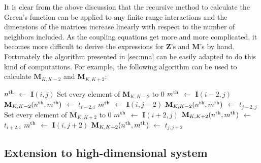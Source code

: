 It is clear from the above discussion that the recursive method to calculate the Green's function can be applied to 
any finite range interactions and the dimensions of the matrices increase linearly with respect to the number of 
neighbors included. As the coupling equations get more and more complicated, it becomes more difficult to derive 
the expressions for $\mathbf{Z}$'s and $\mathbf{M}$'s by hand. Fortunately the algorithm presented in 
\autoref{sec:nna} can be easily adapted to do this kind of computations. For example, the following algorithm can
be used to calculate $\mathbf{M}_{K,K-2}$ and $\mathbf{M}_{K,K+2}$:
\begin{algorithmic}[1]
     \State $n^{\rm th}$ $\gets$ $\mathbf{I}(i,j)$
     \State Set every element of $\mathbf{M}_{K,K-2}$ to 0
                   \State $m^{\rm th}$ $\gets$ $ \mathbf{I}(i-2, j)$  
                   \State $\mathbf{M}_{K,K-2}(n^{\rm th}, m^{\rm th})$ $\gets$ $t_{i-2, i}$
       \EndIf
%
                   \State $m^{\rm th}$ $\gets$ $ \mathbf{I}(i, j-2)$  
                   \State $\mathbf{M}_{K,K-2}(n^{\rm th}, m^{\rm th})$ $\gets$ $t_{j-2, j}$
       \EndIf
        \State Set every element of $\mathbf{M}_{K,K+2}$ to 0
                   \State $m^{\rm th}$ $\gets$ $ \mathbf{I}(i+2, j)$  
                   \State $\mathbf{M}_{K,K+2}(n^{\rm th}, m^{\rm th})$ $\gets$ $t_{i+2, i}$ 
       \EndIf
%
                   \State $m^{\rm th}$ $\gets$ $ \mathbf{I}(i, j+2)$  
                   \State $\mathbf{M}_{K,K+2}(n^{\rm th}, m^{\rm th})$ $\gets$ $t_{j, j+2}$
       \EndIf
\EndFor
\end{algorithmic}


\subsection{Extension to high-dimensional system}
\label{sec:high-dimension}

